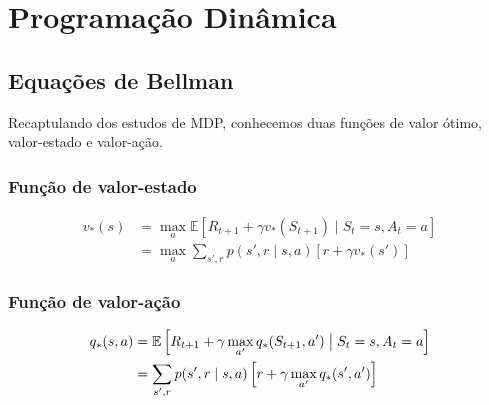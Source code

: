 \documentclass{article}
\begin{document}
            \begin{center}
            \mdpthreestatenoprobs
            \end{center}
    
    \section{Programação Dinâmica}
    
        \subsection{Equações de Bellman}
        
            Recaptulando dos estudos de MDP, conhecemos duas funções de valor ótimo, valor-estado e valor-ação.
        
            \subsubsection{Função de valor-estado}
            
                \begin{equation}
                    \begin{split}
                        v_*(s) & = \max_a \mathbb{E} \left[ R_{t+1} + \gamma v_*(S_{t+1}) \mid S_t = s, A_t = a \right] \\
                        & = \max_a \sum_{s', r} p(s',r \mid s,a) \left[ r + \gamma v_*(s') \right]
                    \end{split}
                \end{equation}
            
            \subsubsection{Função de valor-ação}
        
                \begin{equation}
                    \begin{split}
                        q_*(s,a) & = \mathbb{E} \left[ R_{t+1} + \gamma \max_{a'} q_*(S_{t+1}, a') \bigm\vert S_t = s, A_t = a \right] \\
                        & = \sum_{s', r} p(s',r \mid s,a) \left[ r + \gamma \max_{a'}q_*(s', a') \right]
                    \end{split}
                \end{equation}
                
\end{document}
